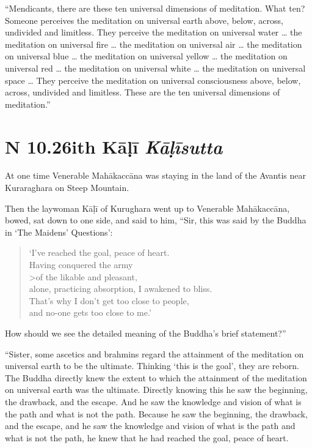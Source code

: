 \documentclass[12pt,openany]{book}%
\newcommand*{\suttatitleacronym}[1]{\smaller[2]{#1}\vspace*{.3em}}
\newcommand*{\suttatitletranslation}[1]{\linebreak{#1}}
\newcommand*{\suttatitleroot}[1]{\linebreak\smaller[2]\itshape{#1}}
\newcommand*{\tocacronym}[1]{\hspace*{-3.3em}{#1}\quad}
\newcommand*{\toctranslation}[1]{#1}
\newcommand*{\tocroot}[1]{(\textit{#1})}
\begin{document}
“Mendicants, there are these ten universal dimensions of meditation. What ten? Someone perceives the meditation on universal earth above, below, across, undivided and limitless. They perceive the meditation on universal water … the meditation on universal fire … the meditation on universal air … the meditation on universal blue … the meditation on universal yellow … the meditation on universal red … the meditation on universal white … the meditation on universal space … They perceive the meditation on universal consciousness above, below, across, undivided and limitless. These are the ten universal dimensions of meditation.” 

%
\section*{{\suttatitleacronym AN 10.26}{\suttatitletranslation With Kāḷī }{\suttatitleroot Kāḷīsutta}}
\addcontentsline{toc}{section}{\tocacronym{AN 10.26} \toctranslation{With Kāḷī } \tocroot{Kāḷīsutta}}

At one time Venerable \textsanskrit{Mahākaccāna} was staying in the land of the Avantis near Kuraraghara on Steep Mountain. 

Then the laywoman \textsanskrit{Kāḷī} of Kurughara went up to Venerable \textsanskrit{Mahākaccāna}, bowed, sat down to one side, and said to him, “Sir, this was said by the Buddha in ‘The Maidens’ Questions’: 

\begin{verse}%
‘I’ve reached the goal, peace of heart. \\
Having conquered the army \\>of the likable and pleasant, \\
alone, practicing absorption, I awakened to bliss. \\
That’s why I don’t get too close to people, \\
and no-one gets too close to me.’ 

%
\end{verse}

How should we see the detailed meaning of the Buddha’s brief statement?” 

“Sister, some ascetics and brahmins regard the attainment of the meditation on universal earth to be the ultimate. Thinking ‘this is the goal’, they are reborn. The Buddha directly knew the extent to which the attainment of the meditation on universal earth was the ultimate. Directly knowing this he saw the beginning, the drawback, and the escape. And he saw the knowledge and vision of what is the path and what is not the path. Because he saw the beginning, the drawback, and the escape, and he saw the knowledge and vision of what is the path and what is not the path, he knew that he had reached the goal, peace of heart. 
\end{document}
